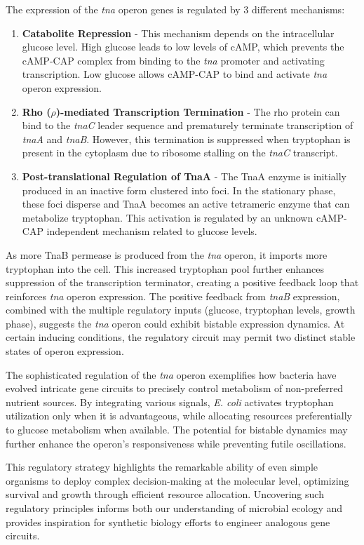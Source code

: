 The expression of the \textit{tna} operon genes is regulated by 3 different mechanisms:
\begin{enumerate}
\item \textbf{Catabolite Repression} - This mechanism depends on the intracellular glucose level. High glucose leads to low levels of cAMP, which prevents the cAMP-CAP complex from binding to the \textit{tna} promoter and activating transcription. Low glucose allows cAMP-CAP to bind and activate \textit{tna} operon expression.
\item \textbf{Rho ($\rho$)-mediated Transcription Termination} - The rho protein can bind to the \textit{tnaC} leader sequence and prematurely terminate transcription of \textit{tnaA} and \textit{tnaB}. However, this termination is suppressed when tryptophan is present in the cytoplasm due to ribosome stalling on the \textit{tnaC} transcript.
\item \textbf{Post-translational Regulation of TnaA} - The TnaA enzyme is initially produced in an inactive form clustered into foci. In the stationary phase, these foci disperse and TnaA becomes an active tetrameric enzyme that can metabolize tryptophan. This activation is regulated by an unknown cAMP-CAP independent mechanism related to glucose levels.
\end{enumerate}

As more TnaB permease is produced from the \textit{tna} operon, it imports more tryptophan into the cell. This increased tryptophan pool further enhances suppression of the transcription terminator, creating a positive feedback loop that reinforces \textit{tna} operon expression. The positive feedback from \textit{tnaB} expression, combined with the multiple regulatory inputs (glucose, tryptophan levels, growth phase), suggests the \textit{tna} operon could exhibit bistable expression dynamics. At certain inducing conditions, the regulatory circuit may permit two distinct stable states of operon expression.

The sophisticated regulation of the \textit{tna} operon exemplifies how bacteria have evolved intricate gene circuits to precisely control metabolism of non-preferred nutrient sources. By integrating various signals, \textit{E. coli} activates tryptophan utilization only when it is advantageous, while allocating resources preferentially to glucose metabolism when available. The potential for bistable dynamics may further enhance the operon's responsiveness while preventing futile oscillations.

This regulatory strategy highlights the remarkable ability of even simple organisms to deploy complex decision-making at the molecular level, optimizing survival and growth through efficient resource allocation. Uncovering such regulatory principles informs both our understanding of microbial ecology and provides inspiration for synthetic biology efforts to engineer analogous gene circuits. 

